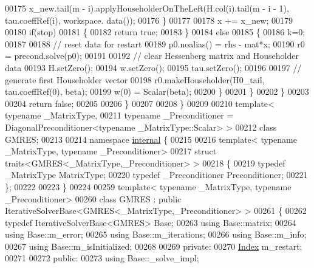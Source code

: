 \begin{DoxyCode}
00175         x\_new.tail(m - i).applyHouseholderOnTheLeft(H.col(i).tail(m - i - 1), tau.coeffRef(i), workspace.
      data());
00176       \}
00177 
00178       x += x\_new;
00179 
00180       \textcolor{keywordflow}{if}(stop)
00181       \{
00182         \textcolor{keywordflow}{return} \textcolor{keyword}{true};
00183       \}
00184       \textcolor{keywordflow}{else}
00185       \{
00186         k=0;
00187 
00188         \textcolor{comment}{// reset data for restart}
00189         p0.noalias() = rhs - mat*x;
00190         r0 = precond.solve(p0);
00191 
00192         \textcolor{comment}{// clear Hessenberg matrix and Householder data}
00193         H.setZero();
00194         w.setZero();
00195         tau.setZero();
00196 
00197         \textcolor{comment}{// generate first Householder vector}
00198         r0.makeHouseholder(H0\_tail, tau.coeffRef(0), beta);
00199         w(0) = Scalar(beta);
00200       \}
00201     \}
00202   \}
00203 
00204   \textcolor{keywordflow}{return} \textcolor{keyword}{false};
00205 
00206 \}
00207 
00208 \}
00209 
00210 \textcolor{keyword}{template}< \textcolor{keyword}{typename} \_MatrixType,
00211           \textcolor{keyword}{typename} \_Preconditioner = DiagonalPreconditioner<typename \_MatrixType::Scalar> >
00212 \textcolor{keyword}{class }GMRES;
00213 
00214 \textcolor{keyword}{namespace }\hyperlink{namespaceinternal}{internal} \{
00215 
00216 \textcolor{keyword}{template}< \textcolor{keyword}{typename} \_MatrixType, \textcolor{keyword}{typename} \_Preconditioner>
00217 \textcolor{keyword}{struct }traits<GMRES<\_MatrixType,\_Preconditioner> >
00218 \{
00219   \textcolor{keyword}{typedef} \_MatrixType MatrixType;
00220   \textcolor{keyword}{typedef} \_Preconditioner Preconditioner;
00221 \};
00222 
00223 \}
00224 
00259 \textcolor{keyword}{template}< \textcolor{keyword}{typename} \_MatrixType, \textcolor{keyword}{typename} \_Preconditioner>
00260 \textcolor{keyword}{class }GMRES : \textcolor{keyword}{public} IterativeSolverBase<GMRES<\_MatrixType,\_Preconditioner> >
00261 \{
00262   \textcolor{keyword}{typedef} IterativeSolverBase<GMRES> Base;
00263   \textcolor{keyword}{using} Base::matrix;
00264   \textcolor{keyword}{using} Base::m\_error;
00265   \textcolor{keyword}{using} Base::m\_iterations;
00266   \textcolor{keyword}{using} Base::m\_info;
00267   \textcolor{keyword}{using} Base::m\_isInitialized;
00268 
00269 \textcolor{keyword}{private}:
00270   \hyperlink{namespace_eigen_a62e77e0933482dafde8fe197d9a2cfde}{Index} m\_restart;
00271 
00272 \textcolor{keyword}{public}:
00273   \textcolor{keyword}{using} Base::\_solve\_impl;

\end{DoxyCode}
